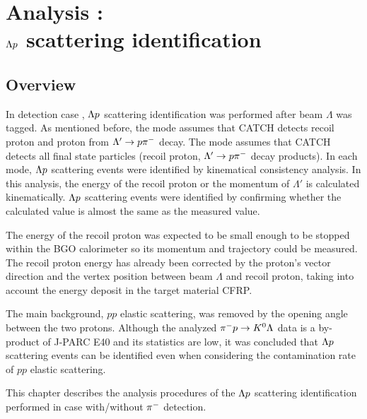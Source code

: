 %

\graphicspath{{./pictures/chapter_Lp_2p}}

\chapter{Analysis : \\$\Lambda p$ scattering identification} 
\label{chap-Lp_2p}

\section{Overview}
In detection case , $\Lambda p$ scattering identification was performed after beam $\Lambda$ was tagged. As mentioned before, the  mode assumes that CATCH detects recoil proton and proton from $\Lambda'\to p\pi^{-}$ decay. The  mode assumes that CATCH detects all final state particles (recoil proton, $\Lambda'\to p\pi^{-}$ decay products). In each mode, $\Lambda p$ scattering events were identified by kinematical consistency analysis. In this analysis, the energy of the recoil proton or the momentum of $\Lambda'$ is calculated kinematically. $\Lambda p$ scattering events were identified by confirming whether the calculated value is almost the same as the measured value.

The energy of the recoil proton was expected to be small enough to be stopped within the BGO calorimeter so its momentum and trajectory could be measured. The recoil proton energy has already been corrected by the proton's vector direction and the vertex position between beam $\Lambda$ and recoil proton, taking into account the energy deposit in the target material CFRP.

The main background, $pp$ elastic scattering, was removed by the opening angle between the two protons. Although the analyzed $\pi^- p \to K^0 \Lambda$ data is a by-product of J-PARC E40 and its statistics are low, it was concluded that $\Lambda p$ scattering events can be identified even when considering the contamination rate of $pp$ elastic scattering.

This chapter describes the analysis procedures of the $\Lambda p$ scattering identification performed in case  with/without $\pi^{-}$ detection.


